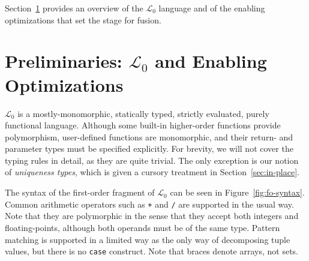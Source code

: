 \documentclass{sigplanconf}  %
\newcommand{\LO}{$\mathcal{L}_0$}
\begin{document}
Section~\ref{sec:Prelim} provides an overview of the \LO{} language %
and of the enabling optimizations that set the stage for fusion. %







\section{Preliminaries: $\mathcal{L}_0$ and Enabling Optimizations}
\label{sec:Prelim}

\LO{} is a mostly-monomorphic, statically typed, strictly evaluated,
purely functional language.  Although some built-in higher-order
functions provide polymorphism, user-defined functions are
monomorphic, and their return- and parameter types must be specified
explicitly.  For brevity, we will not cover the typing
rules in detail, as they are quite trivial.  The only exception is our
notion of {\em uniqueness types}, which is given a cursory treatment
in Section~\ref{sec:in-place}.

The syntax of the first-order fragment of \LO{} can be seen in Figure~\ref{fig:fo-syntax}.  
Common arithmetic operators such as {\tt +} and
{\tt /} are supported in the usual way.  Note that they are
polymorphic in the sense that they accept both integers and
floating-points, although both operands must be of the same type.
Pattern matching is supported in a limited way as the only way of
decomposing tuple values, but there is no {\tt case} construct.  
Note that braces denote arrays, not sets.
\end{document}
